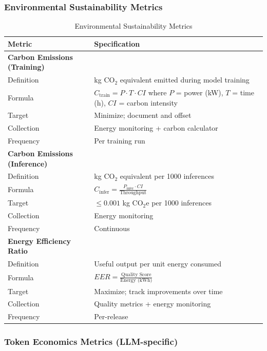 \subsubsection{Environmental Sustainability Metrics}

\begin{table}[!htbp]
\centering
\caption{Environmental Sustainability Metrics}
\label{tab:sustainability_metrics}
\small
\begin{tabularx}{\linewidth}{@{}l X@{}}
\toprule
\textbf{Metric} & \textbf{Specification} \\
\midrule
\textbf{Carbon Emissions (Training)} & \\
Definition & kg CO$_2$ equivalent emitted during model training \\
Formula & $C_{\text{train}} = P \cdot T \cdot CI$ where $P$ = power (kW), $T$ = time (h), $CI$ = carbon intensity \\
Target & Minimize; document and offset \\
Collection & Energy monitoring + carbon calculator \\
Frequency & Per training run \\
\addlinespace

\textbf{Carbon Emissions (Inference)} & \\
Definition & kg CO$_2$ equivalent per 1000 inferences \\
Formula & $C_{\text{infer}} = \frac{P_{\text{infer}} \cdot CI}{\text{Throughput}}$ \\
Target & $\leq 0.001$ kg CO$_2$e per 1000 inferences \\
Collection & Energy monitoring \\
Frequency & Continuous \\
\addlinespace

\textbf{Energy Efficiency Ratio} & \\
Definition & Useful output per unit energy consumed \\
Formula & $EER = \frac{\text{Quality Score}}{\text{Energy (kWh)}}$ \\
Target & Maximize; track improvements over time \\
Collection & Quality metrics + energy monitoring \\
Frequency & Per-release \\
\bottomrule
\end{tabularx}
\end{table}

\subsubsection{Token Economics Metrics (LLM-specific)}

